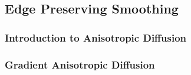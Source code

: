 


\subsection{Edge Preserving Smoothing}
\label{sec:EdgePreservingSmoothingFilters}

\subsubsection{Introduction to Anisotropic Diffusion}
\label{sec:IntroductionAnisotropicDiffusion}
\ifitkFullVersion

\fi


\subsubsection{Gradient Anisotropic Diffusion}
\label{sec:GradientAnisotropicDiffusionImageFilter}

\ifitkFullVersion

\fi








